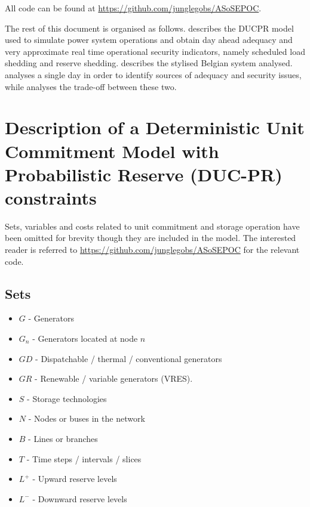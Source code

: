 \documentclass[number,times]{elsarticle}
\begin{document}
All code can be found at \href{https://github.com/junglegobs/ASoSEPOC}{https://github.com/junglegobs/ASoSEPOC}.

The rest of this document is organised as follows.  describes the \ac{DUCPR} model used to simulate power system operations and obtain day ahead adequacy and very approximate real time operational security indicators, namely scheduled load shedding and reserve shedding.  describes the stylised Belgian system analysed.  analyses a single day in order to identify sources of adequacy and security issues, while  analyses the trade-off between these two.

\section{Description of a Deterministic Unit Commitment Model with Probabilistic Reserve (DUC-PR) constraints} \label{sec:model}

Sets, variables and costs related to unit commitment and storage operation have been omitted for brevity though they are included in the model. The interested reader is referred to \href{https://github.com/junglegobs/ASoSEPOC}{https://github.com/junglegobs/ASoSEPOC} for the relevant code.

\subsection{Sets}

\begin{itemize}
    \item $G$ - Generators
    \item $G_n$ - Generators located at node $n$
    \item $GD$ - Dispatchable / thermal / conventional generators
    \item $GR$ - Renewable / variable generators (\ac{VRES}).
    \item $S$ - Storage technologies
    \item $N$ - Nodes or buses in the network
    \item $B$ - Lines or branches
    \item $T$ - Time steps / intervals / slices
    \item $L^+$ - Upward reserve levels
    \item $L^-$ - Downward reserve levels
\end{itemize}
\end{document}

